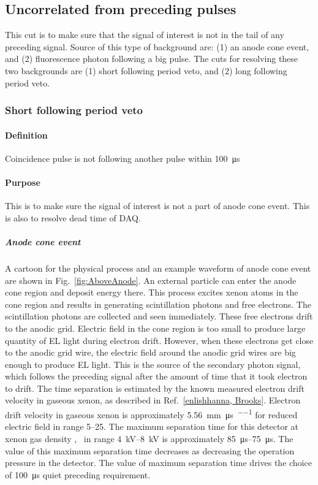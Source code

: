 
\subsection{Uncorrelated from preceding pulses}
\label{sec:uncor}
This cut is to make sure that the signal of interest is not in the tail of any preceding signal.
Source of this type of background are: (1) an anode cone event, and (2) fluorescence photon following a big pulse. The cuts for resolving these two backgrounds are (1) short following period veto, and (2) long following period veto.
 
\subsubsection{Short following period veto}

\paragraph{Definition}
Coincidence pulse is not following another pulse within \SI{100}{\us}
\paragraph{Purpose}
This is to make sure the signal of interest is not a part of anode cone event. This is also to resolve dead time of DAQ. 

\subparagraph{Anode cone event} A cartoon for the physical process and an example waveform of anode cone event are shown in Fig.~\ref{fig:AboveAnode}. An external particle can enter the anode cone region and deposit energy there. This process excites xenon atoms in the cone region and results in generating scintillation photons and free electrons. The scintillation photons are collected and seen immediately. These free electrons drift to the anodic grid. Electric field in the cone region is too small to produce large quantity of EL light during electron drift. However, when these electrons get close to the anodic grid wire, the electric field around the anodic grid wires are big enough to produce EL light. This is the source of the secondary photon signal, which follows the preceding signal after the amount of time that it took electron to drift. The time separation is estimated by the known measured electron drift velocity in gaseous xenon, as described in Ref.~\ref{enlishhanna, Brooks}. Electron drift velocity in gaseous xenon is approximately \SI{5.56}{\mm\per\us\per\townsend} for reduced electric field in range \SIrange{5}{25}{\townsend}. The maximum separation time for this detector at xenon gas density \standarddensity , \opvt\ in range \SIrange{+4}{+8}{\kV} is approximately \SIrange{85}{75}{\us}. The value of this maximum separation time decreases as decreasing the operation pressure in the detector. The value of maximum separation time drives the choice of \SI{100}{\us} quiet preceding requirement. 


